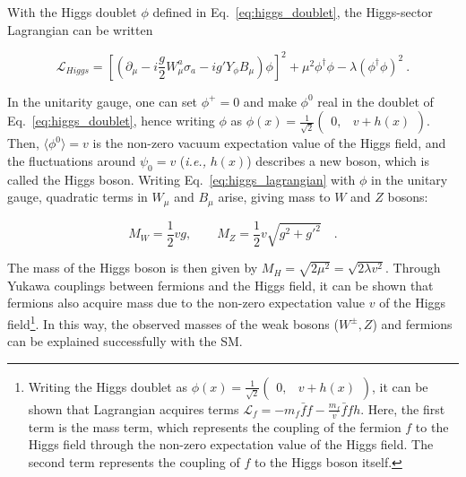 With the Higgs doublet $\phi$ defined in Eq.~\ref{eq:higgs_doublet}, the Higgs-sector Lagrangian can be written

\begin{equation}
    \mathcal{L}_{Higgs} = \left[ \left( \partial_{\mu} - i \frac{g}{2} W_{\mu}^{a} \sigma_{a} - ig' Y_{\phi} B_{\mu} \right) \phi \right]^{2} + \mu^2 \phi^{\dag} \phi - \lambda \left( \phi^{\dag} \phi \right)^{2} \ .
    \label{eq:higgs_lagrangian}
\end{equation}

In the unitarity gauge, one can set $\phi^{+} = 0$ and make $\phi^{0}$ real in the doublet of Eq.~\ref{eq:higgs_doublet}, hence writing $\phi$ as
$\phi(x) = \frac{1}{\sqrt{2}} \begin{pmatrix} 0, & v + h(x) \end{pmatrix}$. 
Then, $\langle \phi^{0} \rangle = v$ is the non-zero vacuum expectation value of the Higgs field, and the fluctuations around $\psi_{0} = v$
(\textit{i.e.,} $h(x)$) describes a new boson, which is called the Higgs boson. Writing Eq.~\ref{eq:higgs_lagrangian} with $\phi$ in the unitary gauge, 
quadratic terms in $W_{\mu}$ and $B_{\mu}$ arise, giving mass to $W$ and $Z$ bosons:

\begin{equation}
    M_{W} = \frac{1}{2} v g, \qquad M_{Z} = \frac{1}{2} v \sqrt{g^2 + g'^{2}} \quad .
\end{equation}

The mass of the Higgs boson is then given by $M_{H} = \sqrt{2 \mu^2} = \sqrt{2 \lambda v^2}$. Through Yukawa couplings between fermions and the
Higgs field, it can be shown that fermions also acquire mass due to the non-zero expectation value $v$ 
of the Higgs field\footnote{Writing the Higgs doublet as $\phi(x) = \frac{1}{\sqrt{2}} \begin{pmatrix} 0, & v + h(x) \end{pmatrix}$, it can be shown that
Lagrangian acquires terms $\mathcal{L}_{f} = -m_{f} \bar{f} f - \frac{m_f}{v} \bar{f} f h $. Here, the first term is the mass term, which
represents the coupling of the fermion $f$ to the Higgs field through the non-zero expectation value of the Higgs field.
The second term represents the coupling of $f$ to the Higgs boson itself.}. In this way, the observed masses of the weak bosons ($W^{\pm}, Z$)
and fermions can be explained successfully with the SM.

